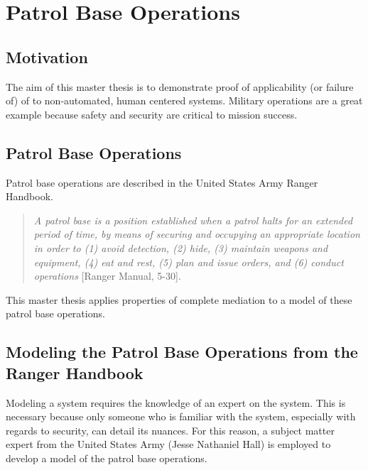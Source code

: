 \documentclass[../../main/main.tex]{subfiles}
\begin{document}
\chapter{Patrol Base Operations}\label{chp:pb}
\section{Motivation}
The aim of this master thesis is to demonstrate proof of applicability (or failure of) of  to non-automated, human centered systems.  Military operations are a great example because safety and security are critical to mission success.

\section{Patrol Base Operations}
Patrol base operations are described in the United States Army Ranger Handbook.

\begin{quote}
\textit{A patrol base is a position established when a patrol halts for an extended period of time, by means of securing and occupying an appropriate location in order to (1) avoid detection, (2) hide, (3) maintain weapons and equipment, (4) eat and rest, (5) plan and issue orders, and (6) conduct operations} [Ranger Manual, 5-30].
\end{quote}

This master thesis applies properties of complete mediation to a model of these patrol base operations.

\section{Modeling the Patrol Base Operations from the Ranger Handbook}\label{sec:modelingpb}
\glsresetall[\acronymtype]

Modeling a system requires the knowledge of an expert on the system.  This is necessary because only someone who is familiar with the system, especially with regards to security, can detail its nuances.  For this reason, a subject matter expert from the United States Army (Jesse Nathaniel Hall) is employed to develop a model of the patrol base operations. 
\end{document}
